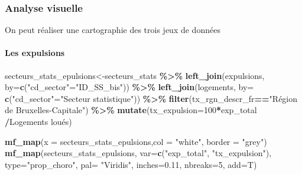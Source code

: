\documentclass[
]{book}
\newenvironment{Shaded}{\begin{snugshade}}{\end{snugshade}}
\newcommand{\AttributeTok}[1]{\textcolor[rgb]{0.13,0.29,0.53}{#1}}
\newcommand{\DecValTok}[1]{\textcolor[rgb]{0.00,0.00,0.81}{#1}}
\newcommand{\FloatTok}[1]{\textcolor[rgb]{0.00,0.00,0.81}{#1}}
\newcommand{\FunctionTok}[1]{\textcolor[rgb]{0.13,0.29,0.53}{\textbf{#1}}}
\newcommand{\NormalTok}[1]{#1}
\newcommand{\OtherTok}[1]{\textcolor[rgb]{0.56,0.35,0.01}{#1}}
\newcommand{\SpecialCharTok}[1]{\textcolor[rgb]{0.81,0.36,0.00}{\textbf{#1}}}
\newcommand{\StringTok}[1]{\textcolor[rgb]{0.31,0.60,0.02}{#1}}
\begin{document}
\hypertarget{analyse-visuelle}{%
\subsubsection{Analyse visuelle}\label{analyse-visuelle}}

On peut réaliser une cartographie des trois jeux de données

\hypertarget{les-expulsions}{%
\paragraph{Les expulsions}\label{les-expulsions}}

\begin{Shaded}
\begin{Highlighting}[]
\NormalTok{secteurs\_stats\_epulsions}\OtherTok{\textless{}{-}}\NormalTok{secteurs\_stats }\SpecialCharTok{\%\textgreater{}\%}
  \FunctionTok{left\_join}\NormalTok{(expulsions,  }\AttributeTok{by=}\FunctionTok{c}\NormalTok{(}\StringTok{"cd\_sector"}\OtherTok{=}\StringTok{"ID\_SS\_bis"}\NormalTok{)) }\SpecialCharTok{\%\textgreater{}\%}
  \FunctionTok{left\_join}\NormalTok{(logements, }\AttributeTok{by=} \FunctionTok{c}\NormalTok{(}\StringTok{"cd\_sector"}\OtherTok{=}\StringTok{"Secteur statistique"}\NormalTok{)) }\SpecialCharTok{\%\textgreater{}\%}
  \FunctionTok{filter}\NormalTok{(tx\_rgn\_descr\_fr}\SpecialCharTok{==}\StringTok{"Région de Bruxelles{-}Capitale"}\NormalTok{) }\SpecialCharTok{\%\textgreater{}\%}
  \FunctionTok{mutate}\NormalTok{(}\AttributeTok{tx\_expulsion=}\DecValTok{100}\SpecialCharTok{*}\NormalTok{exp\_total }\SpecialCharTok{/}\StringTok{\textasciigrave{}}\AttributeTok{Logements loués}\StringTok{\textasciigrave{}}\NormalTok{)}

\FunctionTok{mf\_map}\NormalTok{(}\AttributeTok{x =}\NormalTok{ secteurs\_stats\_epulsions,}\AttributeTok{col =} \StringTok{"white"}\NormalTok{, }\AttributeTok{border =} \StringTok{"grey"}\NormalTok{)}
\FunctionTok{mf\_map}\NormalTok{(secteurs\_stats\_epulsions,}
       \AttributeTok{var=}\FunctionTok{c}\NormalTok{(}\StringTok{"exp\_total"}\NormalTok{, }\StringTok{"tx\_expulsion"}\NormalTok{),}
       \AttributeTok{type=}\StringTok{"prop\_choro"}\NormalTok{,}
       \AttributeTok{pal=} \StringTok{"Viridis"}\NormalTok{,}
       \AttributeTok{inches=}\FloatTok{0.11}\NormalTok{,}
       \AttributeTok{nbreaks=}\DecValTok{5}\NormalTok{,}
       \AttributeTok{add=}\NormalTok{T)}
\end{Highlighting}
\end{Shaded}
\end{document}
